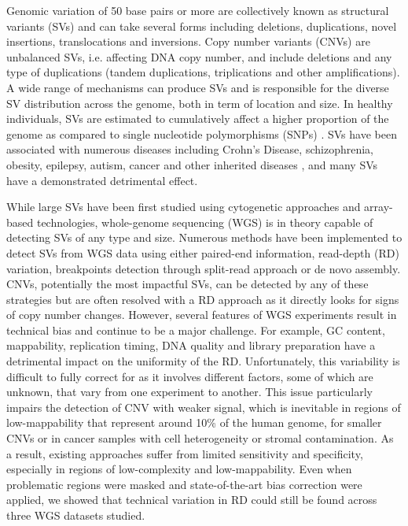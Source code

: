 Genomic variation of 50 base pairs or more are collectively known as structural variants (SVs) and can take several forms including deletions, duplications, novel insertions, translocations and inversions\cite{Hall2012}.
Copy number variants (CNVs) are unbalanced SVs, i.e. affecting DNA copy number, and include deletions and any type of duplications (tandem duplications, triplications and other amplifications).
A wide range of mechanisms can produce SVs and is responsible for the diverse SV distribution across the genome, both in term of location and size\cite{Hall2012,Sharp2006,Mills2011}.
In healthy individuals, SVs are estimated to cumulatively affect a higher proportion of the genome as compared to single nucleotide polymorphisms (SNPs) \cite{Pang2010}.
SVs have been associated with numerous diseases including Crohn's Disease\cite{McCarroll2008a}, schizophrenia\cite{Stone2008}, obesity\cite{Bochukova2010}, epilepsy\cite{Mefford2011}, autism\cite{Stefansson2014}, cancer\cite{Beroukhim2010} and other inherited diseases \cite{Balzola2010,Ayarpadikannan2014}, and many SVs have a demonstrated detrimental effect. 

While large SVs have been first studied using cytogenetic approaches and array-based technologies, whole-genome sequencing (WGS) is in theory capable of detecting SVs of any type and size\cite{Alkan2011}.
Numerous methods have been implemented to detect SVs from WGS data using either paired-end information\cite{Chen2009,Lindberg2014}, read-depth (RD) variation\cite{Boeva2011,Abyzov2011,Klambauer2012}, breakpoints detection through split-read approach\cite{Ye2009} or de novo assembly\cite{Rimmer2014}.
CNVs, potentially the most impactful SVs, can be detected by any of these strategies but are often resolved with a RD approach as it directly looks for signs of copy number changes.
However, several features of WGS experiments result in technical bias and continue to be a major challenge.
For example, GC content\cite{Benjamini2012}, mappability\cite{Treangen2011,Teo2012}, replication timing\cite{Koren2014}, DNA quality and library preparation\cite{VanDijk2014} have a detrimental impact on the uniformity of the RD\cite{Cheung2011}.
Unfortunately, this variability is difficult to fully correct for as it involves different factors, some of which are unknown, that vary from one experiment to another.
This issue particularly impairs the detection of CNV with weaker signal, which is inevitable in regions of low-mappability that represent around 10\% of the human genome\cite{Derrien2012}, for smaller CNVs or in cancer samples with cell heterogeneity or stromal contamination.
As a result, existing approaches suffer from limited sensitivity and specificity\cite{Mills2011,Alkan2011}, especially in regions of low-complexity and low-mappability\cite{Treangen2011,Teo2012}.
Even when problematic regions were masked and state-of-the-art bias correction\cite{Benjamini2012,Scheinin2014} were applied, we showed that technical variation in RD could still be found across three WGS datasets studied\cite{Monlong2018}.

